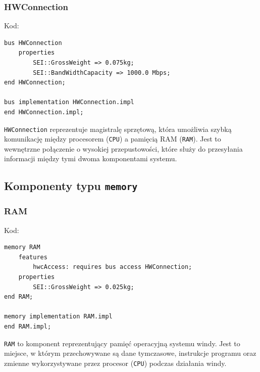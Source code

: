 \documentclass{article}
\begin{document}
    \newpage

    \subsubsection{HWConnection}

    Kod:
    
    \begin{lstlisting}[basicstyle=\ttfamily, keywordstyle=\bfseries]
bus HWConnection
    properties
        SEI::GrossWeight => 0.075kg;
        SEI::BandWidthCapacity => 1000.0 Mbps;
end HWConnection;

bus implementation HWConnection.impl
end HWConnection.impl;
    \end{lstlisting}

    \texttt{HWConnection} reprezentuje magistralę sprzętową, która umożliwia szybką komunikację między procesorem (\texttt{CPU}) a pamięcią RAM (\texttt{RAM}). Jest to wewnętrzne połączenie o wysokiej przepustowości, które służy do przesyłania informacji między tymi dwoma komponentami systemu.










    \subsection{Komponenty typu \texttt{memory}}

    
    \subsubsection{RAM}

    Kod:
    
    \begin{lstlisting}[basicstyle=\ttfamily, keywordstyle=\bfseries]
memory RAM
    features
        hwcAccess: requires bus access HWConnection;
    properties
        SEI::GrossWeight => 0.025kg;
end RAM;

memory implementation RAM.impl
end RAM.impl;
    \end{lstlisting}

    \texttt{RAM} to komponent reprezentujący pamięć operacyjną systemu windy. Jest to miejsce, w którym przechowywane są dane tymczasowe, instrukcje programu oraz zmienne wykorzystywane przez procesor (\texttt{CPU}) podczas działania windy. 



    \newpage
\end{document}
